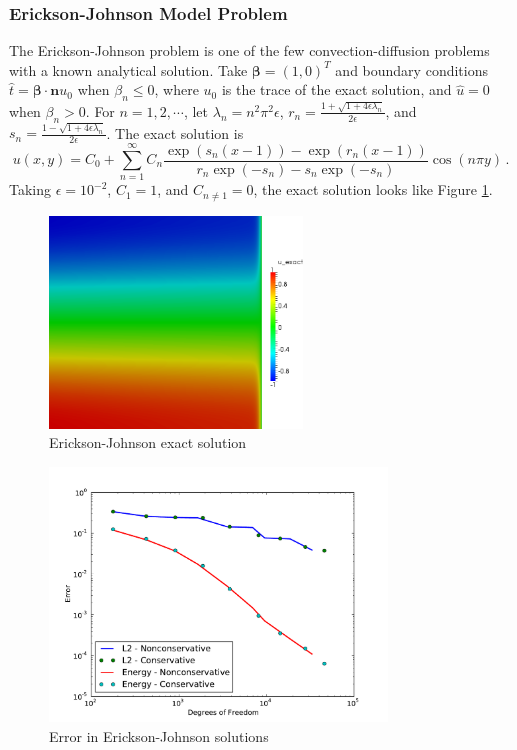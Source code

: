 \documentclass[letterpaper]{article}
\def\bbeta{\boldsymbol\beta}
\begin{document}
\subsubsection{Erickson-Johnson Model Problem}
The Erickson-Johnson problem is one of the few convection-diffusion problems
with a known analytical solution. Take 
$\bbeta=(1,0)^T$ and boundary conditions $\hat t=\bbeta\cdot\mathbf{n} u_0$ when
$\beta_n\le0$, where $u_0$ is the trace of the exact solution, and $\hat u=0$
when $\beta_n>0$. For
$n=1,2,\cdots$, let
$\lambda_n=n^2\pi^2\epsilon$,
$r_n=\frac{1+\sqrt{1+4\epsilon\lambda_n}}{2\epsilon}$, and 
$s_n=\frac{1-\sqrt{1+4\epsilon\lambda_n}}{2\epsilon}$. The exact solution
is
\begin{equation}
u(x,y)=C_0+\sum_{n=1}^\infty C_n\frac{\exp(s_n(x-1))-\exp(r_n(x-1))}
{r_n\exp(-s_n)-s_n\exp(-s_n)}\cos(n\pi y)\,.
\label{eq:ericksonExact}
\end{equation}
Taking $\epsilon=10^{-2}$, $C_1=1$, and $C_{n\neq1}=0$, the exact solution looks
like Figure \ref{fig:erickson}. 

\begin{figure}[p]
\centering
\includegraphics[width=0.6\textwidth]{figs/Erickson/exact.png}
\caption{Erickson-Johnson exact solution}
\label{fig:erickson}
\end{figure}

\begin{figure}[p]
\centering
\includegraphics[width=0.8\textwidth]{figs/Erickson/modifiedError.pdf}
\caption{Error in Erickson-Johnson solutions}
\label{fig:ericksonError}
\end{figure}
\end{document}
